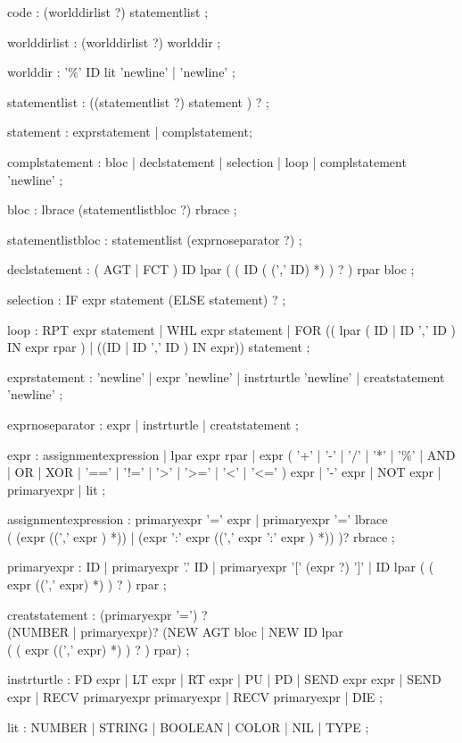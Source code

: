 \begin{rail}
code : (worlddirlist ?) statementlist ;

worlddirlist : (worlddirlist ?) worlddir
;

worlddir : '\%' ID lit 'newline'
| 'newline'
;

statementlist : ((statementlist ?) statement ) ?
;

statement : exprstatement | complstatement;

complstatement : bloc
| declstatement
| selection
| loop
| complstatement 'newline'
;

bloc : lbrace (statementlistbloc ?) rbrace
;

statementlistbloc : statementlist (exprnoseparator ?)
;

declstatement : ( AGT | FCT ) ID lpar ( ( ID ( (',' ID) *) ) ? ) rpar bloc
;

selection : IF expr statement (ELSE statement) ? ;

loop : RPT expr statement
| WHL expr statement
| FOR (( lpar ( ID | ID ',' ID ) IN expr rpar ) | ((ID | ID ',' ID ) IN expr)) statement
;

exprstatement : 'newline'
| expr 'newline'
| instrturtle 'newline'
| creatstatement 'newline'
;

exprnoseparator : expr
| instrturtle
| creatstatement
;

expr : assignmentexpression
| lpar expr rpar
| expr ( '+'
| '-'
| '/'
| '*'
| '\%'
| AND
| OR
| XOR
| '=='
| '!='
| '>'
| '>='
| '<'
| '<=' ) expr
| '-' expr
| NOT expr
| primaryexpr
| lit
;

assignmentexpression : primaryexpr '=' expr
| primaryexpr '=' lbrace \\ (
(expr ((',' expr ) *))
| (expr ':' expr ((',' expr ':' expr ) *))
)? rbrace
;

primaryexpr : ID
| primaryexpr '.' ID
| primaryexpr '[' (expr ?) ']'
| ID lpar ( ( expr ((',' expr) *) ) ? )  rpar
;

creatstatement : (primaryexpr '=') ? \\ (NUMBER | primaryexpr)? (NEW AGT bloc
| NEW ID lpar \\ ( ( expr ((',' expr) *) ) ? ) rpar)
;

instrturtle : FD expr
| LT expr
| RT expr
| PU
| PD
| SEND expr expr
| SEND expr
| RECV primaryexpr primaryexpr
| RECV primaryexpr
| DIE ;

lit : NUMBER
| STRING
| BOOLEAN
| COLOR
| NIL
| TYPE ;
\end{rail}



